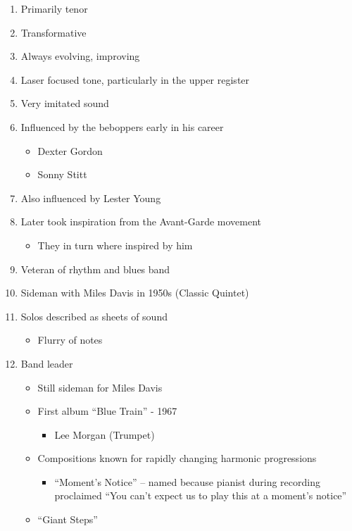 \documentclass[]{article}
\providecommand{\tightlist}{%
  \setlength{\itemsep}{0pt}\setlength{\parskip}{0pt}}
\begin{document}
\begin{enumerate}
\def\labelenumi{\arabic{enumi}.}
\tightlist
\item
  Primarily tenor
\item
  Transformative
\item
  Always evolving, improving
\item
  Laser focused tone, particularly in the upper register
\item
  Very imitated sound
\item
  Influenced by the beboppers early in his career

  \begin{itemize}
  \tightlist
  \item
    Dexter Gordon
  \item
    Sonny Stitt
  \end{itemize}
\item
  Also influenced by Lester Young
\item
  Later took inspiration from the Avant-Garde movement

  \begin{itemize}
  \tightlist
  \item
    They in turn where inspired by him
  \end{itemize}
\item
  Veteran of rhythm and blues band
\item
  Sideman with Miles Davis in 1950s (Classic Quintet)
\item
  Solos described as sheets of sound

  \begin{itemize}
  \tightlist
  \item
    Flurry of notes
  \end{itemize}
\item
  Band leader

  \begin{itemize}
  \tightlist
  \item
    Still sideman for Miles Davis
  \item
    First album ``Blue Train'' - 1967

    \begin{itemize}
    \tightlist
    \item
      Lee Morgan (Trumpet)
    \end{itemize}
  \item
    Compositions known for rapidly changing harmonic progressions

    \begin{itemize}
    \tightlist
    \item
      ``Moment's Notice'' -- named because pianist during recording
      proclaimed ``You can't expect us to play this at a moment's
      notice''
    \end{itemize}
  \item
    ``Giant Steps''


\end{itemize}
\end{enumerate}
\end{document}
